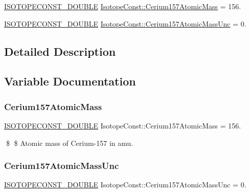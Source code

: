 \begin{DoxyCompactItemize}
\item 
\mbox{\hyperlink{group___isotope_const-_macros_ga8f45a7272ce02c0b4c65c44636ed719a}{I\+S\+O\+T\+O\+P\+E\+C\+O\+N\+S\+T\+\_\+\+D\+O\+U\+B\+LE}} \mbox{\hyperlink{group___isotope_const-_cerium-_ce157_gaeb5e17f249f8cbe8fea8059345538078}{Isotope\+Const\+::\+Cerium157\+Atomic\+Mass}} = 156.
\item 
\mbox{\hyperlink{group___isotope_const-_macros_ga8f45a7272ce02c0b4c65c44636ed719a}{I\+S\+O\+T\+O\+P\+E\+C\+O\+N\+S\+T\+\_\+\+D\+O\+U\+B\+LE}} \mbox{\hyperlink{group___isotope_const-_cerium-_ce157_ga356e79cf2a5a253ab1726b6b3226cb1a}{Isotope\+Const\+::\+Cerium157\+Atomic\+Mass\+Unc}} = 0.
\end{DoxyCompactItemize}


\subsection{Detailed Description}


\subsection{Variable Documentation}
\mbox{\label{group___isotope_const-_cerium-_ce157_gaeb5e17f249f8cbe8fea8059345538078}} 
\subsubsection{\texorpdfstring{Cerium157\+Atomic\+Mass}{Cerium157AtomicMass}}
{\footnotesize\ttfamily \mbox{\hyperlink{group___isotope_const-_macros_ga8f45a7272ce02c0b4c65c44636ed719a}{I\+S\+O\+T\+O\+P\+E\+C\+O\+N\+S\+T\+\_\+\+D\+O\+U\+B\+LE}} Isotope\+Const\+::\+Cerium157\+Atomic\+Mass = 156.}

\$ \$ Atomic mass of Cerium-\/157 in amu. \mbox{\label{group___isotope_const-_cerium-_ce157_ga356e79cf2a5a253ab1726b6b3226cb1a}} 
\subsubsection{\texorpdfstring{Cerium157\+Atomic\+Mass\+Unc}{Cerium157AtomicMassUnc}}
{\footnotesize\ttfamily \mbox{\hyperlink{group___isotope_const-_macros_ga8f45a7272ce02c0b4c65c44636ed719a}{I\+S\+O\+T\+O\+P\+E\+C\+O\+N\+S\+T\+\_\+\+D\+O\+U\+B\+LE}} Isotope\+Const\+::\+Cerium157\+Atomic\+Mass\+Unc = 0.}

